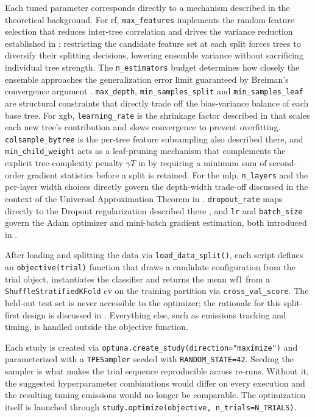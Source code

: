 Each tuned parameter corresponds directly to a mechanism described in the theoretical background. For \gls{rf}, \texttt{max\_features} implements the random feature selection that reduces inter-tree correlation and drives the variance reduction established in : restricting the candidate feature set at each split forces trees to diversify their splitting decisions, lowering ensemble variance without sacrificing individual tree strength. The \texttt{n\_estimators} budget determines how closely the ensemble approaches the generalization error limit guaranteed by Breiman's convergence argument \parencite{breimanRandomForests2001}. \texttt{max\_depth}, \texttt{min\_samples\_split} and \texttt{min\_samples\_leaf} are structural constraints that directly trade off the bias-variance balance of each base tree. For \gls{xgb}, \texttt{learning\_rate} is the shrinkage factor described in  that scales each new tree's contribution and slows convergence to prevent overfitting. \texttt{colsample\_bytree} is the per-tree feature subsampling also described there, and \texttt{min\_child\_weight} acts as a leaf-pruning mechanism that complements the explicit tree-complexity penalty $\gamma T$ in  by requiring a minimum sum of second-order gradient statistics before a split is retained. For the \gls{mlp}, \texttt{n\_layers} and the per-layer width choices directly govern the depth-width trade-off discussed in the context of the Universal Approximation Theorem in . \texttt{dropout\_rate} maps directly to the Dropout regularization described there \parencite{srivastavaDropoutSimpleWay2014}, and \texttt{lr} and \texttt{batch\_size} govern the Adam optimizer and mini-batch gradient estimation, both introduced in .

After loading and splitting the data via \texttt{load\_data\_split()}, each script defines an \texttt{objective(trial)} function that draws a candidate configuration from the trial object, instantiates the classifier and returns the mean \gls{wf1} from a \texttt{ShuffleStratifiedKFold} \gls{cv} on the training partition via \texttt{cross\_val\_score}. The held-out test set is never accessible to the optimizer; the rationale for this split-first design is discussed in . Everything else, such as emissions tracking and timing, is handled outside the objective function.

Each study is created via \texttt{optuna.create\_study(direction="maximize")} and parameterized with a \texttt{TPESampler} seeded with \texttt{RANDOM\_STATE=42}. Seeding the sampler is what makes the trial sequence reproducible across re-runs. Without it, the suggested hyperparameter combinations would differ on every execution and the resulting tuning emissions would no longer be comparable. The optimization itself is launched through \texttt{study.optimize(objective, n\_trials=N\_TRIALS)}.

